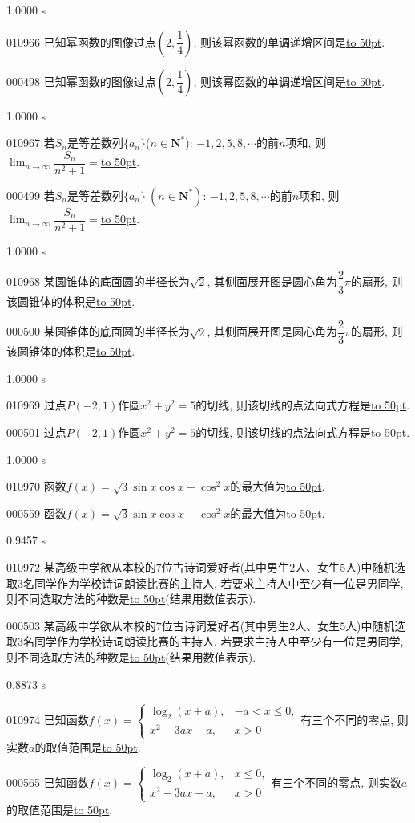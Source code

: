 \documentclass[10pt,a4paper]{article}
\newcommand{\blank}[1]{\underline{\hbox to #1pt{}}}
\begin{document}
1.0000 s

010966	已知幂函数的图像过点$(2,\dfrac 14)$, 则该幂函数的单调递增区间是\blank{50}.

000498	已知幂函数的图像过点$(2,\dfrac14)$, 则该幂函数的单调递增区间是\blank{50}.

1.0000 s

010967	若$S_n$是等差数列$\{a_n\}$($n\in \mathbf{N}^*$): $-1,2,5,8,\cdots$的前$n$项和, 则$\displaystyle\lim_{n\to\infty}\dfrac{S_n}{n^2+1}=$\blank{50}.

000499	若$S_n$是等差数列$\{a_n\}\ (n\in \mathbf{N}^*)$: $-1,2,5,8,\cdots$的前$n$项和, 则$\displaystyle\lim_{n\to\infty}\dfrac{{S_n}}{{n^2}+1}=$\blank{50}.

1.0000 s

010968	某圆锥体的底面圆的半径长为$\sqrt 2$, 其侧面展开图是圆心角为$\dfrac 23\pi$的扇形, 则该圆锥体的体积是\blank{50}.

000500	某圆锥体的底面圆的半径长为$\sqrt2$, 其侧面展开图是圆心角为$\dfrac23\pi$的扇形, 则该圆锥体的体积是\blank{50}.

1.0000 s

010969	过点$P(-2,1)$作圆$x^2+y^2=5$的切线, 则该切线的点法向式方程是\blank{50}.

000501	过点$P(-2,1)$作圆$x^2+y^2=5$的切线, 则该切线的点法向式方程是\blank{50}.

1.0000 s

010970	函数$f(x)=\sqrt 3\sin x\cos x+\cos ^2x$的最大值为\blank{50}.

000559	函数$f(x)=\sqrt3\sin x\cos x+\cos^2x$的最大值为\blank{50}.

0.9457 s

010972	某高级中学欲从本校的$7$位古诗词爱好者(其中男生$2$人、女生$5$人)中随机选取3名同学作为学校诗词朗读比赛的主持人, 若要求主持人中至少有一位是男同学, 则不同选取方法的种数是\blank{50}(结果用数值表示).

000503	某高级中学欲从本校的$7$位古诗词爱好者(其中男生$2$人、女生$5$人)中随机选取$3$名同学作为学校诗词朗读比赛的主持人. 若要求主持人中至少有一位是男同学, 则不同选取方法的种数是\blank{50}(结果用数值表示).

0.8873 s

010974	已知函数$f(x)=\begin{cases}  \log_2(x+a), & -a<x\le 0,  \\ x^2-3ax+a, & x>0  \end{cases}$有三个不同的零点, 则实数$a$的取值范围是\blank{50}.

000565	已知函数$f(x)=\begin{cases} \log_2 (x+a), & x\le 0, \\ x^2-3ax+a, & x>0 \end{cases}$有三个不同的零点, 则实数$a$的取值范围是\blank{50}.
\end{document}
